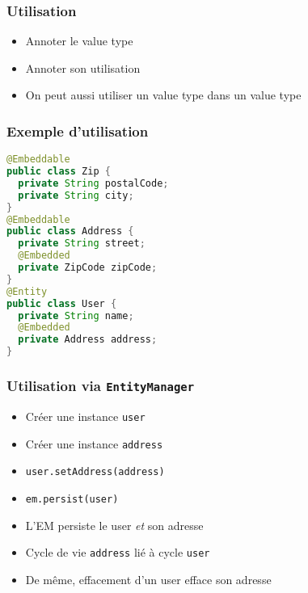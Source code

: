 \documentclass[english, french]{beamer}
\begin{document}
\begin{frame}
	\frametitle{Utilisation}
	\begin{itemize}
		\item Annoter le value type 
		\item Annoter son utilisation 
		\item On peut aussi utiliser un value type dans un value type
	\end{itemize}
\end{frame}

\begin{frame}[fragile]
	\frametitle{Exemple d’utilisation}
	\begin{minipage}{6.3cm}
		\begin{lstlisting}[language=Java]
@Embeddable
public class Zip {
  private String postalCode;
  private String city;
}
@Embeddable
public class Address {
  private String street;
  @Embedded
  private ZipCode zipCode;
}
@Entity
public class User {
  private String name;
  @Embedded
  private Address address;
}
		\end{lstlisting}
	\end{minipage}%
	\begin{minipage}{\columnwidth - 6.3cm}
	\end{minipage}
\end{frame}

\begin{frame}
	\frametitle{Utilisation via \texttt{EntityManager}}
	\begin{itemize}
		\item Créer une instance \texttt{user}
		\item Créer une instance \texttt{address}
		\item \texttt{user.setAddress(address)}
		\item \texttt{em.persist(user)}
		\item L’EM persiste le user \emph{et} son adresse
		\item Cycle de vie \texttt{address} lié à cycle \texttt{user}
		\item De même, effacement d’un user efface son adresse
	\end{itemize}
\end{frame}
\end{document}
